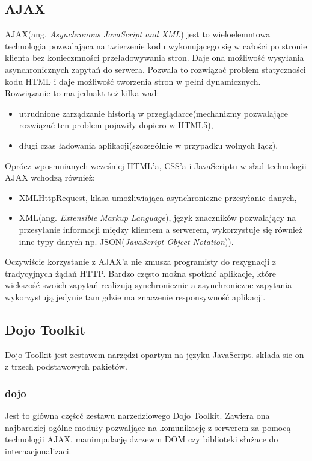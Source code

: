 \subsection[AJAX][AJAX]{AJAX}
AJAX(ang. \textit{Asynchronous JavaScript and XML}) jest to wieloelemntowa technologia pozwalająca na twierzenie kodu wykonującego się w całości po stronie klienta bez konieczmności przeładowywania stron. Daje ona możliwość wysyłania asynchronicznych zapytań do serwera. Pozwala to rozwiązać problem statyczności kodu HTML i daje możliwość tworzenia stron w pełni dynamicznych. Rozwiązanie to ma jednakt też kilka wad:
\begin{itemize}
	\item utrudnione zarządzanie historią w przeglądarce(mechanizmy pozwalające rozwiązać ten problem pojawiły dopiero w HTML5),
	\item długi czas ładowania aplikacji(szczególnie w przypadku wolnych łącz).
\end{itemize}
Oprócz wposmnianych wcześniej HTML'a, CSS'a i JavaScriptu w sład technologii AJAX wchodzą również:
\begin{itemize}
	\item XMLHttpRequest, klasa umożliwiająca asynchroniczne przesyłanie danych,
	\item XML(ang. \textit{Extensible Markup Language}), język znaczników pozwalający na przesyłanie informacji między klientem a serwerem, wykorzystuje się również inne typy danych np. JSON(\textit{JavaScript Object Notation})).
\end{itemize}
Oczywiście korzystanie z AJAX'a nie zmusza programisty do rezygnacji z tradycyjnych żądań HTTP. Bardzo często można spotkać aplikacje, które wiekszość swoich zapytań realizują synchronicznie a asynchroniczne zapytania wykorzystują jedynie tam gdzie ma znaczenie responsywność aplikacji.

\subsection[Dojo Toolkit][Dojo Toolkit]{Dojo Toolkit}
Dojo Toolkit jest zestawem narzędzi opartym na języku JavaScript. składa sie on z trzech podstawowych pakietów.

\subsubsection[dojo][dojo]{dojo}
Jest to główna częścć zestawu narzedziowego Dojo Toolkit. Zawiera ona najbardziej ogólne moduły pozwaljące na komunikację z serwerem za pomocą technologii AJAX, manimpulację dzrzewm DOM czy biblioteki służace do internacjonalizaci.


